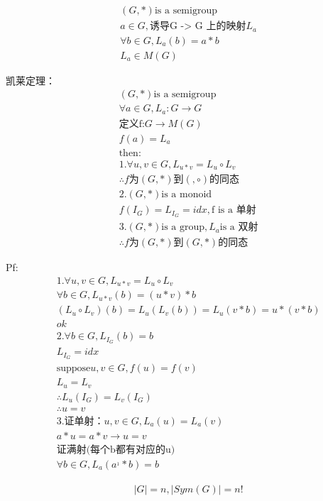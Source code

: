 \documentclass[12pt, a4paper]{article}  %
\begin{document}
\begin{align}
    &(G,*)\text{is a semigroup}\\
    &a\in G,\text{诱导G -> G 上的映射}L_a\\
    &\forall b\in G, L_a(b)=a*b\\
    &L_a\in M(G)
\end{align}

凯莱定理：
\begin{align}
    &(G,*)\text{is a semigroup}\\
    &\forall a\in G,L_a:G\rightarrow G\\
    &\text{定义f:}G\rightarrow M(G)\\
    &f(a)=L_a\\
    &\text{then:}\\
    &1.\forall u,v\in G,L_{u*v}=L_u\circ L_v\\
    &\therefore f \text{为} (G,*)\text{到}(,\circ) \text{的同态}\\
    &2. (G,*) \text{is a monoid}\\
    &f(I_G)=L_{I_G}=idx,\text{f is a 单射}\\
    &3. (G,*) \text{is a group},L_a\text{is a 双射}\\
    &\therefore f \text{为} (G,*) \text{到} (G,*) \text{的同态}
\end{align}

Pf:
\begin{align}
    &1. \forall u,v\in G,L_{u*v}=L_u\circ L_v\\
    &\forall b\in G, L_{u*v}(b)=(u*v)*b\\
    &(L_u\circ L_v)(b)=L_u(L_v(b))=L_u(v*b)=u*(v*b)\\
    &ok\\
    &2.\forall b\in G,L_{I_G}(b)=b\\
    &L_{I_G}=idx\\
    &\text{suppose} u,v\in G,f(u)=f(v)\\
    & L_u=L_v\\
    &\therefore L_u(I_G)=L_v(I_G)\\
    &\therefore u=v\\
    &3. \text{证单射：}u,v\in G,L_a(u)=L_a(v)\\
    & a*u=a*v\rightarrow u=v\\
    &\text{证满射(每个b都有对应的u)}\\
    &\forall b\in G, L_a(a^{_1}*b)=b
\end{align}

\begin{align}
    &|G|=n,|Sym(G)|=n!
\end{align}
\end{document}
